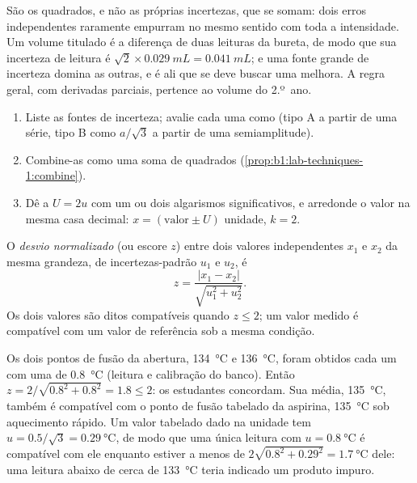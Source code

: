 São os quadrados, e não as próprias incertezas, que se somam: dois erros
independentes raramente empurram no mesmo sentido com toda a intensidade.
Um volume titulado é a diferença de duas leituras da bureta, de modo que
sua incerteza de leitura é
$\sqrt2 \times \qty{0.029}{mL} = \qty{0.041}{mL}$; e uma fonte grande de
incerteza domina as outras, e é ali que se deve buscar uma melhora. A
regra geral, com derivadas parciais, pertence ao volume do 2.º~ano.

\begin{method}\label{met:b1:lab-techniques-1:report-result}
\begin{enumerate}
  \item Liste as fontes de incerteza; avalie cada uma como 
        (tipo A a partir de uma série, tipo B como $a/\sqrt3$ a partir de
        uma semiamplitude).
  \item Combine-as como uma soma de quadrados (\cref{prop:b1:lab-techniques-1:combine}).
  \item Dê a  $U = 2u$ com um ou dois algarismos
        significativos, e arredonde o valor na mesma casa decimal:
        $x = (\text{valor} \pm U)$ unidade, $k = 2$.
\end{enumerate}
\end{method}

\begin{definition}\label{def:b1:lab-techniques-1:z-score}
O \emph{desvio normalizado} (ou escore $z$)
entre dois valores independentes $x_1$ e $x_2$ da mesma grandeza, de
incertezas-padrão $u_1$ e $u_2$, é
\[
  z = \frac{|x_1 - x_2|}{\sqrt{u_1^2 + u_2^2}} .
\]
Os dois valores são ditos compatíveis quando $z \le 2$; um valor medido é
compatível com um valor de referência sob a mesma condição.
\end{definition}

\begin{example}
Os dois pontos de fusão da abertura, \qty{134}{\celsius} e
\qty{136}{\celsius}, foram obtidos cada um com uma  de
\qty{0.8}{\celsius} (leitura e calibração do banco). Então
$z = 2/\sqrt{0.8^2 + 0.8^2} = 1.8 \le 2$: os estudantes concordam. Sua
média, \qty{135}{\celsius}, também é compatível com o ponto de fusão
tabelado da aspirina, \qty{135}{\celsius} sob aquecimento rápido. Um valor
tabelado dado na unidade tem $u = 0.5/\sqrt3 = \qty{0.29}{\celsius}$, de
modo que uma única leitura com $u = \qty{0.8}{\celsius}$ é compatível com
ele enquanto estiver a menos de $2\sqrt{0.8^2 + 0.29^2} = \qty{1.7}{\celsius}$
dele: uma leitura abaixo de cerca de \qty{133}{\celsius} teria indicado um
produto impuro.
\end{example}


